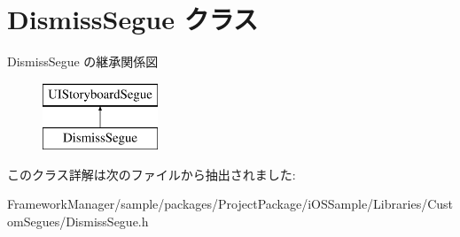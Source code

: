 \hypertarget{interface_dismiss_segue}{}\section{Dismiss\+Segue クラス}
\label{interface_dismiss_segue}
Dismiss\+Segue の継承関係図\begin{figure}[H]
\begin{center}
\leavevmode
\includegraphics[height=2.000000cm]{interface_dismiss_segue}
\end{center}
\end{figure}


このクラス詳解は次のファイルから抽出されました\+:\begin{DoxyCompactItemize}
\item 
Framework\+Manager/sample/packages/\+Project\+Package/i\+O\+S\+Sample/\+Libraries/\+Custom\+Segues/Dismiss\+Segue.\+h\end{DoxyCompactItemize}
